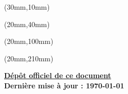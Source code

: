\begin{textblock*}{500mm}(30mm,10mm)
\sffamily
\bfseries\fontsize{52}{42}\selectfont
{ \color{white} 
\TITLE
}
\end{textblock*}

\null\newpage

\begin{textblock*}{\paperwidth}(20mm,40mm)
\raggedright
\sffamily
\bfseries\fontsize{52}{42}\selectfont
\TITLE
\end{textblock*}

\begin{textblock*}{\paperwidth}(20mm,100mm)
\bfseries\fontsize{15}{15}\selectfont
\raggedright
\AUTHORS
\end{textblock*}


\begin{textblock*}{\paperwidth}(20mm,210mm)
\raggedright
\sffamily
\bfseries\fontsize{10}{10}\selectfont
\href{https://github.com/NicholasLangevin/Guide_de_survie_en_actuariat}{Dépôt officiel de ce document} \\
Dernière mise à jour : \today
\end{textblock*}

\null\newpage
